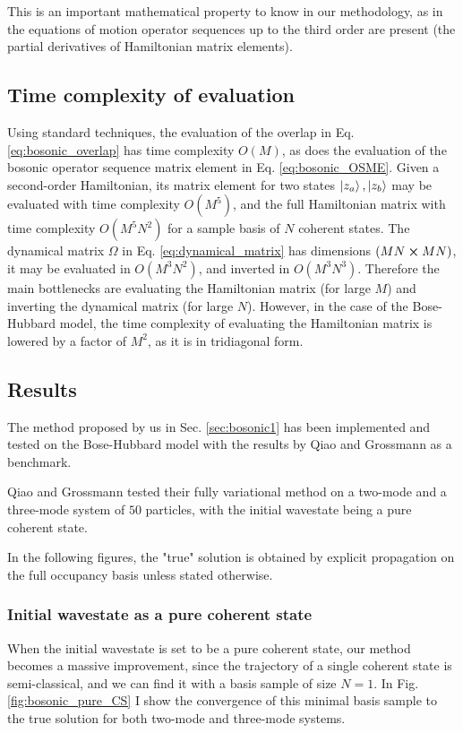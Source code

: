 This is an important mathematical property to know in our methodology, as in the equations of motion operator sequences up to the third order are present (the partial derivatives of Hamiltonian matrix elements).

\subsection{Time complexity of evaluation}
Using standard techniques, the evaluation of the overlap in Eq. \ref{eq:bosonic_overlap} has time complexity $O(M)$, as does the evaluation of the bosonic operator sequence matrix element in Eq. \ref{eq:bosonic_OSME}. Given a second-order Hamiltonian, its matrix element for two states $\ket{z_a},\ket{z_b}$ may be evaluated with time complexity $O(M^5)$, and the full Hamiltonian matrix with time complexity $O(M^5N^2)$ for a sample basis of $N$ coherent states. The dynamical matrix $\Omega$ in Eq. \ref{eq:dynamical_matrix} has dimensions $(MN\cross MN)$, it may be evaluated in $O(M^3N^2)$, and inverted in $O(M^3N^3)$. Therefore the main bottlenecks are evaluating the Hamiltonian matrix (for large $M$) and inverting the dynamical matrix (for large $N$). However, in the case of the Bose-Hubbard model, the time complexity of evaluating the Hamiltonian matrix is lowered by a factor of $M^2$, as it is in tridiagonal form.


\subsection{Results}
The method proposed by us in Sec. \ref{sec:bosonic1} has been implemented and tested on the Bose-Hubbard model with the results by Qiao and Grossmann as a benchmark.

Qiao and Grossmann tested their fully variational method on a two-mode and a three-mode system of $50$ particles, with the initial wavestate being a pure coherent state.

In the following figures, the "true" solution is obtained by explicit propagation on the full occupancy basis unless stated otherwise.

\subsubsection{Initial wavestate as a pure coherent state}
When the initial wavestate is set to be a pure coherent state, our method becomes a massive improvement, since the trajectory of a single coherent state is semi-classical, and we can find it with a basis sample of size $N=1$. In Fig. \ref{fig:bosonic_pure_CS} I show the convergence of this minimal basis sample to the true solution for both two-mode and three-mode systems.

